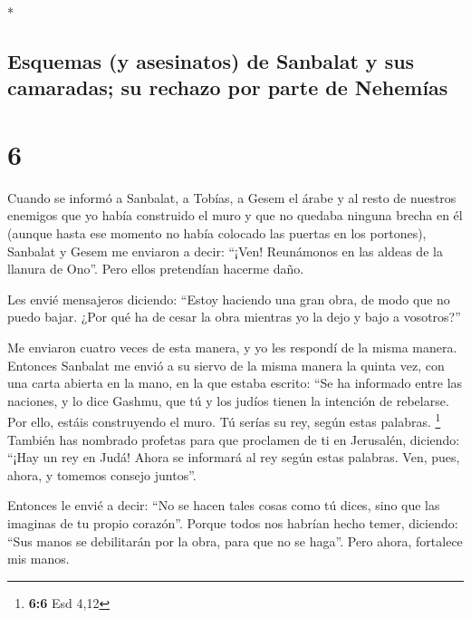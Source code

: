 \begin{paracol}{2}
\begin{otherlanguage}{english}
\end{otherlanguage}

\switchcolumn[0]*

\hypertarget{esquemas-y-asesinatos-de-sanbalat-y-sus-camaradas-su-rechazo-por-parte-de-nehemuxedas}{%
\subsection{Esquemas (y asesinatos) de Sanbalat y sus camaradas; su
rechazo por parte de
Nehemías}\label{esquemas-y-asesinatos-de-sanbalat-y-sus-camaradas-su-rechazo-por-parte-de-nehemuxedas}}

\hypertarget{section-10}{%
\section{6}\label{section-10}}

 Cuando se informó a Sanbalat, a Tobías, a Gesem el árabe
y al resto de nuestros enemigos que yo había construido el muro y que no
quedaba ninguna brecha en él (aunque hasta ese momento no había colocado
las puertas en los portones),  Sanbalat y Gesem me
enviaron a decir: ``¡Ven! Reunámonos en las aldeas de la llanura de
Ono''. Pero ellos pretendían hacerme daño.

 Les envié mensajeros diciendo: ``Estoy haciendo una gran
obra, de modo que no puedo bajar. ¿Por qué ha de cesar la obra mientras
yo la dejo y bajo a vosotros?''

 Me enviaron cuatro veces de esta manera, y yo les
respondí de la misma manera.  Entonces Sanbalat me envió a
su siervo de la misma manera la quinta vez, con una carta abierta en la
mano,  en la que estaba escrito: ``Se ha informado entre
las naciones, y lo dice Gashmu, que tú y los judíos tienen la intención
de rebelarse. Por ello, estáis construyendo el muro. Tú serías su rey,
según estas palabras. \footnote{\textbf{6:6} Esd 4,12} 
También has nombrado profetas para que proclamen de ti en Jerusalén,
diciendo: ``¡Hay un rey en Judá! Ahora se informará al rey según estas
palabras. Ven, pues, ahora, y tomemos consejo juntos''.

 Entonces le envié a decir: ``No se hacen tales cosas como
tú dices, sino que las imaginas de tu propio corazón''. 
Porque todos nos habrían hecho temer, diciendo: ``Sus manos se
debilitarán por la obra, para que no se haga''. Pero ahora, fortalece
mis manos.


\end{paracol}
